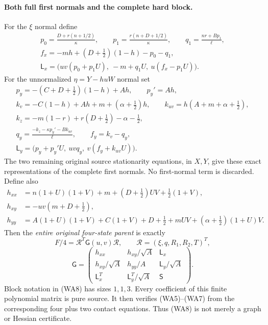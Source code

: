 \paragraph{Both full first normals and the complete hard block.}
For the $\xi$ normal define
\[
 \begin{gathered}
 p_0=\frac{D+r(n+1/2)}\kappa,\qquad
 p_1=\frac{r(n+D+1/2)}\kappa,\qquad
 q_1=\frac{nr+Bp_1}\ell,\\
 f_x=-mh+(D+\tfrac12)(1-h)-p_0-q_1,\\
 \mathsf L_x=\bigl(uv(p_0+p_1U),\ -m+q_1U,\
                                u(f_x-p_1U)\bigr).
 \end{gathered}                                        \tag{WA6}
\]
For the unnormalized $\eta=Y-huW$ normal set
\[
 \begin{gathered}
 p_y=-(C+D+\tfrac12)(1-h)+Ah,\qquad p_y'=Ah,\\
 k_v=-C(1-h)+Ah+m+(\alpha+\tfrac12)h,\qquad
 k_{uv}=h(A+m+\alpha+\tfrac12),\\
 k_z=-m(1-r)+r(D+\tfrac12)-\alpha-\tfrac12,\\
 q_y=\frac{-k_z-\kappa p_y'-Bk_{uv}}\ell,\qquad
 f_y=k_v-q_y,\\
 \mathsf L_y=\bigl(p_y+p_y'U,\ uvq_y,\
                                      v(f_y+k_{uv}U)\bigr).
 \end{gathered}                                        \tag{WA7}
\]
The two remaining original source stationarity equations, in $X,Y$,
give these exact representations of the complete first normals.
No first-normal term is discarded. Define also
\[
 \begin{split}
 h_{xx}&=n(1+U)(1+V)+m+(D+\tfrac12)UV+\tfrac12(1+V),\\
 h_{xy}&=-uv(m+D+\tfrac12),\\
 h_{yy}&=A(1+U)(1+V)+C(1+V)+D+\tfrac12
                   +mUV+(\alpha+\tfrac12)(1+U)V.
 \end{split}
\]
Then the \emph{entire original four-state parent} is exactly
\[
 F/4=\mathcal R^T\mathsf G(u,v)\mathcal R,\qquad
 \mathcal R=(\xi,q,R_1,R_2,T)^T,
\]
\[
 \mathsf G=
 \begin{pmatrix}
 h_{xx}&h_{xy}/\sqrt A&\mathsf L_x\\
 h_{xy}/\sqrt A&h_{yy}/A&\mathsf L_y/\sqrt A\\
 \mathsf L_x^T&\mathsf L_y^T/\sqrt A&\mathsf S
 \end{pmatrix}.                                       \tag{WA8}
\]
Block notation in (WA8) has sizes $1,1,3$. Every coefficient of this finite polynomial matrix is pure source.
 It then verifies (WA5)--(WA7) from the corresponding
four plus two contact equations. Thus (WA8) is not merely a graph
or Hessian certificate.

